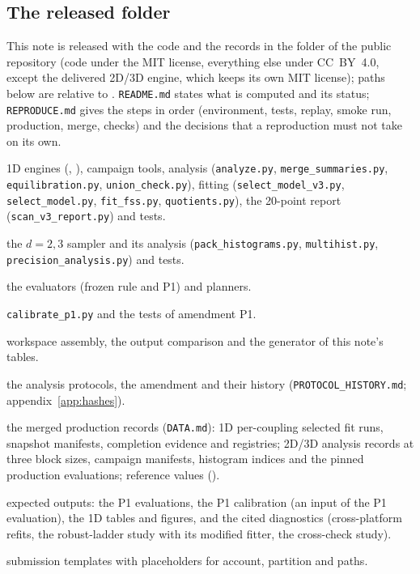 \documentclass[10pt,a4paper]{article}
\newcommand{\code}[1]{\texttt{#1}}
\begin{document}
\subsection{The released folder}
This note is released with the code and the records in the  folder of the public repository (code under the MIT license, everything else under CC~BY~4.0, except the delivered 2D/3D
engine, which keeps its own MIT license); paths
below are relative to . \code{README.md} states what is computed and its status; \code{REPRODUCE.md} gives the steps in order
(environment, tests, replay, smoke run, production, merge, checks) and the decisions that a reproduction must not take on its own.
\begin{description}[leftmargin=1.2em,font=\ttfamily]
\item[code/1d/] 1D engines (, ), campaign tools, analysis (\code{analyze.py}, \code{merge\_summaries.py},
 \code{equilibration.py}, \code{union\_check.py}), fitting (\code{select\_model\_v3.py}, \code{select\_model.py}, \code{fit\_fss.py},
 \code{quotients.py}), the 20-point report (\code{scan\_v3\_report.py}) and tests.
\item[code/2d3d\_engine/] the $d=2,3$ sampler and its analysis (\code{pack\_histograms.py}, \code{multihist.py},
 \code{precision\_analysis.py}) and tests.
\item[code/2d/, code/3d/] the evaluators (frozen rule and P1) and planners.
\item[code/reanalysis\_p1/] \code{calibrate\_p1.py} and the tests of amendment P1.
\item[code/package\_tools/] workspace assembly, the output comparison and the generator of this note's tables.
\item[protocols/] the analysis protocols, the amendment and their history (\code{PROTOCOL\_HISTORY.md}; appendix~\ref{app:hashes}).
\item[data/] the merged production records (\code{DATA.md}): 1D per-coupling selected fit runs, snapshot manifests, completion evidence and
 registries; 2D/3D analysis records at three block sizes, campaign manifests, histogram indices and the pinned production evaluations;
 reference values ().
\item[results/] expected outputs: the P1 evaluations, the P1 calibration (an input of the P1 evaluation), the 1D tables and figures, and the
 cited diagnostics (cross-platform refits, the robust-ladder study with its modified fitter, the cross-check study).
\item[slurm/] submission templates with placeholders for account, partition and paths.
\end{description}
\end{document}
